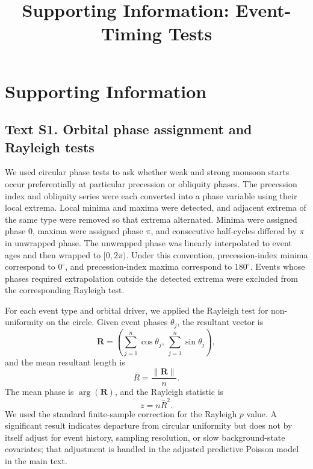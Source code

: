 \documentclass[11pt]{article}
\title{Supporting Information: Event-Timing Tests}
\author{}
\date{}
\begin{document}
\renewcommand{\thefigure}{S\arabic{figure}}
\renewcommand{\thetable}{S\arabic{table}}
\maketitle

\section*{Supporting Information}

\subsection*{Text S1. Orbital phase assignment and Rayleigh tests}

We used circular phase tests to ask whether weak and strong monsoon starts occur preferentially at particular precession or obliquity phases. The precession index and obliquity series were each converted into a phase variable using their local extrema. Local minima and maxima were detected, and adjacent extrema of the same type were removed so that extrema alternated. Minima were assigned phase \(0\), maxima were assigned phase \(\pi\), and consecutive half-cycles differed by \(\pi\) in unwrapped phase. The unwrapped phase was linearly interpolated to event ages and then wrapped to \([0,2\pi)\). Under this convention, precession-index minima correspond to \(0^\circ\), and precession-index maxima correspond to \(180^\circ\). Events whose phases required extrapolation outside the detected extrema were excluded from the corresponding Rayleigh test.

For each event type and orbital driver, we applied the Rayleigh test for non-uniformity on the circle. Given event phases \(\theta_j\), the resultant vector is
\[
\mathbf{R} =
\left(
\sum_{j=1}^{n}\cos\theta_j,\,
\sum_{j=1}^{n}\sin\theta_j
\right),
\]
and the mean resultant length is
\[
\bar{R} = \frac{\|\mathbf{R}\|}{n}.
\]
The mean phase is \(\arg(\mathbf{R})\), and the Rayleigh statistic is
\[
z = n\bar{R}^{2}.
\]
We used the standard finite-sample correction for the Rayleigh \(p\) value. A significant result indicates departure from circular uniformity but does not by itself adjust for event history, sampling resolution, or slow background-state covariates; that adjustment is handled in the adjusted predictive Poisson model in the main text.
\end{document}
